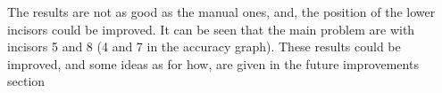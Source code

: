 The results are not as good as the manual ones, and, the position of the lower
incisors could be improved. It can be seen that the main problem are with
incisors 5 and 8 (4 and 7 in the accuracy graph). These results could be
improved, and some ideas as for how, are given in the future improvements section


